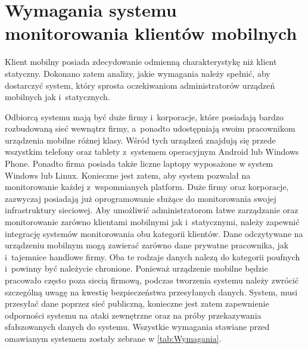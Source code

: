 \section[Wymagania][Wymagania systemu monitorowania klientów
mobilnych]{Wymagania systemu monitorowania klientów mobilnych}

Klient mobilny posiada zdecydowanie odmienną charakterystykę niż
klient statyczny. Dokonano zatem analizy, jakie wymagania należy
spełnić, aby dostarczyć system, który sprosta oczekiwaniom
administratorów urządzeń mobilnych jak i~statycznych.

Odbiorcą systemu mają być duże firmy i~korporacje, które posiadają
bardzo rozbudowaną sieć wewnątrz firmy, a~ponadto udostępniają swoim
pracownikom urządzenia mobilne różnej klasy. Wśród tych urządzeń
znajdują się przede wszystkim telefony oraz tablety z~systemem
operacyjnym Android lub Windows Phone. Ponadto firma posiada także
liczne laptopy wyposażone w system Windows lub Linux. Konieczne jest
zatem, aby system pozwalał na monitorowanie każdej z~wspomnianych
platform. Duże firmy oraz korporacje, zazwyczaj posiadają już
oprogramowanie służące do monitorowania swojej infrastruktury
sieciowej. Aby umożliwić administratorom łatwe zarządzanie oraz
monitorowanie zarówno klientami mobilnymi jak i~statycznymi, należy
zapewnić integrację systemów monitorowania obu kategorii
klientów. Dane odczytywane na urządzeniu mobilnym mogą zawierać
zarówno dane prywatne pracownika, jak i~tajemnice handlowe firmy. Oba
te rodzaje danych nalezą do kategorii poufnych i~powinny być należycie
chronione. Ponieważ urządzenie mobilne będzie pracowało często poza
siecią firmową, podczas tworzenia systemu należy zwrócić szczególną
uwagę na kwestię bezpieczeństwa przesyłanych danych. System, musi
przesyłać dane poprzez sieć publiczną, konieczne jest zatem
zapewnienie odporności systemu na ataki zewnętrzne oraz na próby
przekazywania sfałszowanych danych do systemu. Wszystkie wymagania
stawiane przed omawianym systemem zostały zebrane w
\ref{tab:Wymagania}.

